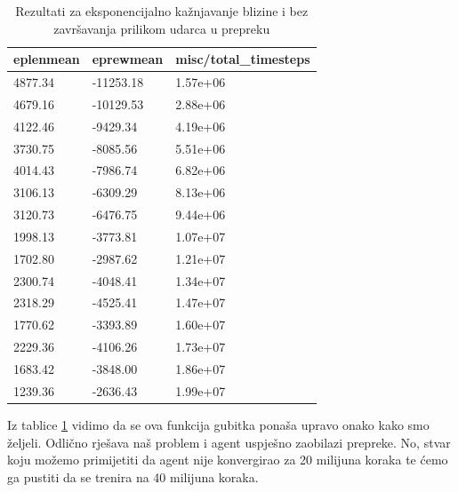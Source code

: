 \documentclass[times,utf8,diplomski]{fer}
\begin{document}
\begin{table}[ht!]
\centering
\caption{Rezultati za eksponencijalno kažnjavanje blizine i bez završavanja prilikom udarca u prepreku}
\label{tab:rek}
\begin{tabular}{@{}lll@{}}
\hline
eplenmean & eprewmean & misc/total\_timesteps \\
\hline
\hline
4877.34 & -11253.18 & 1.57e+06 \\ 
4679.16 & -10129.53 & 2.88e+06 \\ 
4122.46 & -9429.34 & 4.19e+06 \\ 
3730.75 & -8085.56 & 5.51e+06 \\ 
4014.43 & -7986.74 & 6.82e+06 \\ 
3106.13 & -6309.29 & 8.13e+06 \\ 
3120.73 & -6476.75 & 9.44e+06 \\ 
1998.13 & -3773.81 & 1.07e+07 \\ 
1702.80 & -2987.62 & 1.21e+07 \\ 
2300.74 & -4048.41 & 1.34e+07 \\ 
2318.29 & -4525.41 & 1.47e+07 \\ 
1770.62 & -3393.89 & 1.60e+07 \\ 
2229.36 & -4106.26 & 1.73e+07 \\ 
1683.42 & -3848.00 & 1.86e+07 \\ 
1239.36 & -2636.43 & 1.99e+07 \\ 
\hline
\end{tabular}
\end{table}


Iz tablice \ref{tab:rek} vidimo da se ova funkcija gubitka ponaša upravo onako kako smo željeli. Odlično rješava naš problem i agent uspješno zaobilazi prepreke. No, stvar koju možemo primijetiti da agent nije konvergirao za 20 milijuna koraka te ćemo ga pustiti da se trenira na 40 milijuna koraka. 
\end{document}
